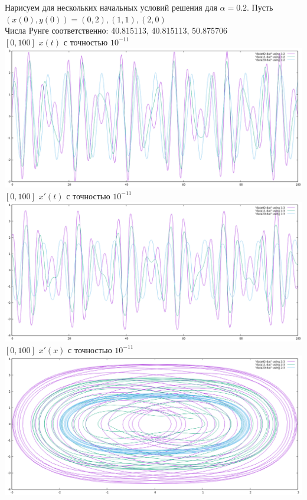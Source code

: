 \documentclass[12pt, a4paper] {report}
\theoremstyle{remark}
\theoremstyle{definition}
\begin{document}
Нарисуем для нескольких начальных условий решения для $\alpha = 0.2$. Пусть $(x(0), y(0)) = {(0,2), (1,1), (2,0)}$ \\Числа Рунге соответственно: 40.815113, 40.815113, 50.875706\\
$[0,100]$ $x(t)$ с точностью $10^{-11}$\\
\includegraphics[scale=0.45]{0211201.png}\\
$[0,100]$ $x'(t)$ с точностью $10^{-11}$\\
\includegraphics[scale=0.45]{0211202.png}\\
\newpage
$[0,100]$ $x'(x)$ с точностью $10^{-11}$\\
\includegraphics[scale=0.45]{0211203.png}\\
\end{document}
